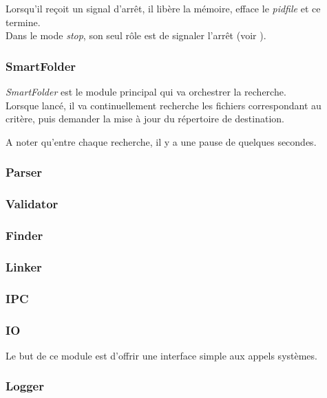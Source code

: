 \documentclass[11pt, a4paper]{article}
\begin{document}
Lorsqu'il reçoit un signal d'arrêt, il libère la mémoire, efface le \textit{pidfile} et ce termine. \\

Dans le mode \textit{stop}, son seul rôle est de signaler l'arrêt (voir ).

\subsubsection{SmartFolder}
\textit{SmartFolder} est le module principal qui va orchestrer la recherche. \\

Lorsque lancé, il va continuellement recherche les fichiers correspondant au critère,
puis demander la mise à jour du répertoire de destination.

A noter qu'entre chaque recherche, il y a une pause de quelques secondes.

\subsubsection{Parser}

\subsubsection{Validator}

\subsubsection{Finder}

\subsubsection{Linker}

\subsubsection{IPC}
\label{sec:ipc}

\subsubsection{IO}
Le but de ce module est d'offrir une interface simple aux appels systèmes.

\subsubsection{Logger}
\end{document}
